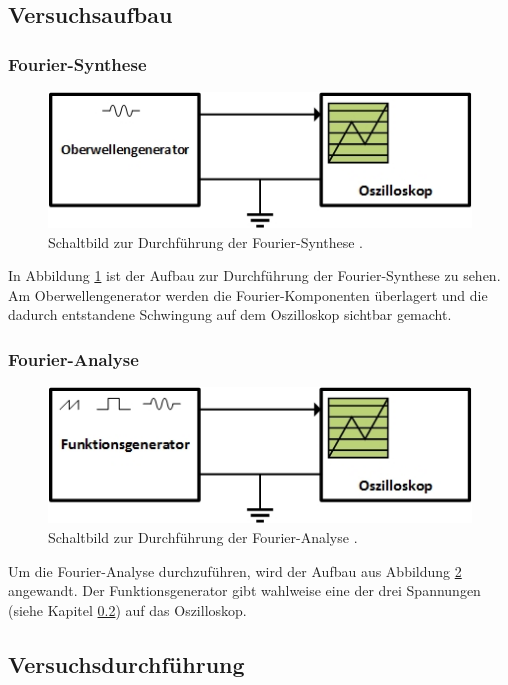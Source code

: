 \subsection{Versuchsaufbau}
\subsubsection{Fourier-Synthese}
\begin{figure}
  \centering
  \includegraphics[scale=0.8]{FourierSynthese.jpg}
  \caption{Schaltbild zur Durchführung der Fourier-Synthese \cite{synthese}.}
  \label{fig:2}
\end{figure}
In Abbildung \ref{fig:2} ist der Aufbau zur Durchführung der Fourier-Synthese
zu sehen. Am Oberwellengenerator werden die Fourier-Komponenten überlagert
und die dadurch entstandene Schwingung auf dem Oszilloskop sichtbar gemacht.

\subsubsection{Fourier-Analyse}
\begin{figure}
  \centering
  \includegraphics[scale=0.8]{FourierAnalyse.jpg}
  \caption{Schaltbild zur Durchführung der Fourier-Analyse \cite{synthese}.}
  \label{fig:3}
\end{figure}
Um die Fourier-Analyse durchzuführen, wird der Aufbau aus Abbildung \ref{fig:3}
angewandt. Der Funktionsgenerator gibt wahlweise eine der drei Spannungen
(siehe Kapitel \ref{sec:durchfuehrung}) auf das Oszilloskop.

\subsection{Versuchsdurchführung}
\label{sec:durchfuehrung}
